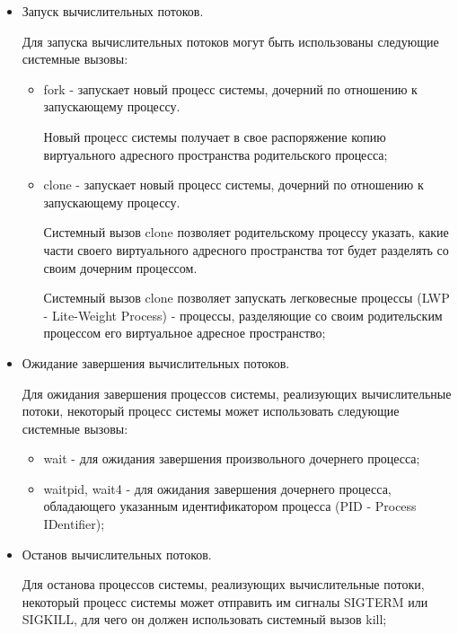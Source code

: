 \begin{itemize}

	\item Запуск вычислительных потоков.

	Для запуска вычислительных потоков могут быть использованы следующие системные вызовы:

	\begin{itemize}

		\item fork - запускает новый процесс системы, дочерний по отношению к запускающему процессу.

		Новый процесс системы получает в свое распоряжение копию виртуального адресного пространства родительского процесса;

		\item clone - запускает новый процесс системы, дочерний по отношению к запускающему процессу.

		 Системный вызов clone позволяет родительскому процессу указать, какие части своего виртуального адресного пространства тот будет разделять со своим дочерним процессом.

		 Системный вызов clone позволяет запускать легковесные процессы (LWP - Lite-Weight Process) - процессы, разделяющие со своим родительским процессом его виртуальное адресное пространство;

	\end{itemize}

	\item Ожидание завершения вычислительных потоков.

	Для ожидания завершения процессов системы, реализующих вычислительные потоки, некоторый процесс системы может использовать следующие системные вызовы:

	\begin{itemize}

		\item wait - для ожидания завершения произвольного дочернего процесса;
		\item waitpid, wait4 - для ожидания завершения дочернего процесса, обладающего указанным идентификатором процесса (PID - Process IDentifier);

	\end{itemize}

	\item Останов вычислительных потоков.

	Для останова процессов системы, реализующих вычислительные потоки, некоторый процесс системы может отправить им сигналы SIGTERM или SIGKILL, для чего он должен использовать системный вызов kill;


\end{itemize}
